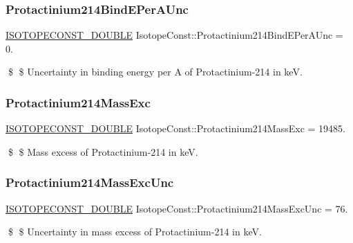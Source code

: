 \subsubsection{\texorpdfstring{Protactinium214\+Bind\+E\+Per\+A\+Unc}{Protactinium214BindEPerAUnc}}
{\footnotesize\ttfamily \mbox{\hyperlink{group___isotope_const-_macros_ga8f45a7272ce02c0b4c65c44636ed719a}{I\+S\+O\+T\+O\+P\+E\+C\+O\+N\+S\+T\+\_\+\+D\+O\+U\+B\+LE}} Isotope\+Const\+::\+Protactinium214\+Bind\+E\+Per\+A\+Unc = 0.}

\$ \$ Uncertainty in binding energy per A of Protactinium-\/214 in keV. \mbox{\label{group___isotope_const-_protactinium-_pa214_gac3ba9ec09e8b28bfad57333ec9cff974}} 
\subsubsection{\texorpdfstring{Protactinium214\+Mass\+Exc}{Protactinium214MassExc}}
{\footnotesize\ttfamily \mbox{\hyperlink{group___isotope_const-_macros_ga8f45a7272ce02c0b4c65c44636ed719a}{I\+S\+O\+T\+O\+P\+E\+C\+O\+N\+S\+T\+\_\+\+D\+O\+U\+B\+LE}} Isotope\+Const\+::\+Protactinium214\+Mass\+Exc = 19485.}

\$ \$ Mass excess of Protactinium-\/214 in keV. \mbox{\label{group___isotope_const-_protactinium-_pa214_ga26af96fa667fbd55e543cdcfc4486168}} 
\subsubsection{\texorpdfstring{Protactinium214\+Mass\+Exc\+Unc}{Protactinium214MassExcUnc}}
{\footnotesize\ttfamily \mbox{\hyperlink{group___isotope_const-_macros_ga8f45a7272ce02c0b4c65c44636ed719a}{I\+S\+O\+T\+O\+P\+E\+C\+O\+N\+S\+T\+\_\+\+D\+O\+U\+B\+LE}} Isotope\+Const\+::\+Protactinium214\+Mass\+Exc\+Unc = 76.}

\$ \$ Uncertainty in mass excess of Protactinium-\/214 in keV. \mbox{\label{group___isotope_const-_protactinium-_pa214_ga807eb1db23291b6d80203c8ba96eed56}} 

